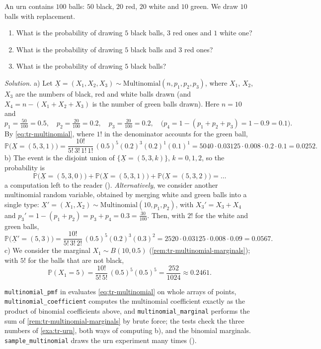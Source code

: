 \begin{example}\label{exa:tr-urn}
An urn contains $100$ balls: $50$ black, $20$ red, $20$ white and $10$ green. We draw $10$ balls
with replacement.
\begin{enumerate}[label=\alph*)]
  \item What is the probability of drawing $5$ black balls, $3$ red ones and $1$ white one?
  \item What is the probability of drawing $5$ black balls and $3$ red ones?
  \item What is the probability of drawing $5$ black balls?
\end{enumerate}
\emph{Solution.} a) Let $\underline X=(X_1,X_2,X_3)\sim\mathrm{Multinomial}(n,p_1,p_2,p_3)$, where
$X_1$, $X_2$, $X_3$ are the numbers of black, red and white balls drawn (and
$X_4=n-(X_1+X_2+X_3)$ is the number of green balls drawn). Here $n=10$ and
\[
  p_1=\tfrac{50}{100}=0.5,\quad p_2=\tfrac{20}{100}=0.2,\quad p_3=\tfrac{20}{100}=0.2,\quad
  \big(p_4=1-(p_1+p_2+p_3)=1-0.9=0.1\big).
\]
By \eqref{eq:tr-multinomial}, where $1!$ in the denominator accounts for the green ball,
\[
  \mathbb P\big(\underline X=(5,3,1)\big)=\frac{10!}{5!\,3!\,1!\,1!}\,(0.5)^5(0.2)^3(0.2)^1(0.1)^1
  =5040\cdot0.03125\cdot0.008\cdot0.2\cdot0.1=0.0252 .
\]
b) The event is the disjoint union of $\{\underline X=(5,3,k)\}$, $k=0,1,2$, so the probability is
\[
  \mathbb P\big(\underline X=(5,3,0)\big)+\mathbb P\big(\underline X=(5,3,1)\big)+\mathbb P\big(\underline X=(5,3,2)\big)=\dots
\]
a computation left to the reader (). \emph{Alternatively}, we consider
another multinomial random variable, obtained by merging white and green balls into a single
type: $\underline X'=(X_1,X_2)\sim\mathrm{Multinomial}(10,p_1,p_2)$, with $X_3'=X_3+X_4$ and
$p_3'=1-(p_1+p_2)=p_3+p_4=0.3=\frac{30}{100}$. Then, with $2!$ for the white and green balls,
\[
  \mathbb P\big(\underline X'=(5,3)\big)=\frac{10!}{5!\,3!\,2!}\,(0.5)^5(0.2)^3(0.3)^2
  =2520\cdot0.03125\cdot0.008\cdot0.09=0.0567 .
\]
c) We consider the marginal $X_1\sim B(10,0.5)$ (\cref{rem:tr-multinomial-marginals}); with $5!$
for the balls that are not black,
\[
  \mathbb P(X_1=5)=\frac{10!}{5!\,5!}\,(0.5)^5(0.5)^5=\frac{252}{1024}\approx0.2461 .
\]
\end{example}

\begin{remark}[computational]\label{rem:tr-multinomial-code}
\texttt{multinomial\_pmf} in  evaluates
\eqref{eq:tr-multinomial} on whole arrays of points, \texttt{multinomial\_coefficient} computes
the multinomial coefficient exactly as the product of binomial coefficients above, and
\texttt{multinomial\_marginal} performs the sum of \cref{rem:tr-multinomial-marginals} by brute
force; the tests check the three numbers of \cref{exa:tr-urn}, both ways of computing b), and the
binomial marginals. \texttt{sample\_multinomial} draws the urn experiment many times
().
\end{remark}

